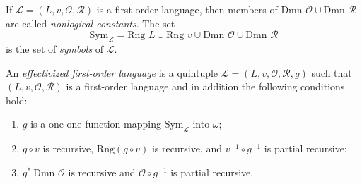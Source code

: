 If $\mathcal{L} = (L, v, \mathcal{O}, \mathcal{R})$ is a first-order language, then members of $\text{Dmn } \mathcal{O} \cup \text{Dmn } \mathcal{R}$ are called \textit{nonlogical constants}. The set
$$\text{Sym}_{\mathcal{L}} = \text{Rng } L \cup \text{Rng } v \cup \text{Dmn } \mathcal{O} \cup \text{Dmn } \mathcal{R}$$
is the set of \textit{symbols} of $\mathcal{L}$.

An \textit{effectivized first-order language} is a quintuple $\mathcal{L} = (L, v, \mathcal{O}, \mathcal{R}, g)$ such that $(L, v, \mathcal{O}, \mathcal{R})$ is a first-order language and in addition the following conditions hold:

\begin{enumerate}
\item[(i)] $g$ is a one-one function mapping $\text{Sym}_{\mathcal{L}}$ into $\omega$;
\item[(ii)] $g \circ v$ is recursive, $\text{Rng}(g \circ v)$ is recursive, and $v^{-1} \circ g^{-1}$ is partial recursive;
\item[(iii)] $g^{*}\ \text{Dmn } \mathcal{O}$ is recursive and $\mathcal{O} \circ g^{-1}$ is partial recursive.
\end{enumerate}
